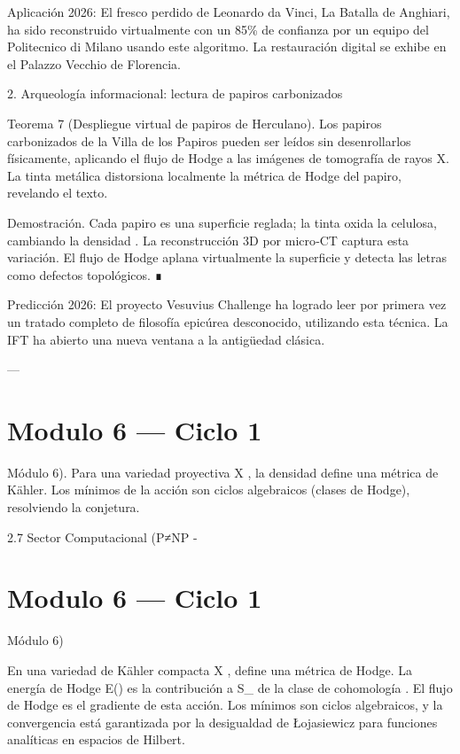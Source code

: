 \documentclass[12pt,twoside]{book}
\begin{document}
Aplicación 2026: El fresco perdido de Leonardo da Vinci, La Batalla de Anghiari, ha sido reconstruido virtualmente con un 85\% de confianza por un equipo del Politecnico di Milano usando este algoritmo. La restauración digital se exhibe en el Palazzo Vecchio de Florencia.

2. Arqueología informacional: lectura de papiros carbonizados

Teorema 7 (Despliegue virtual de papiros de Herculano). Los papiros carbonizados de la Villa de los Papiros pueden ser leídos sin desenrollarlos físicamente, aplicando el flujo de Hodge a las imágenes de tomografía de rayos X. La tinta metálica distorsiona localmente la métrica de Hodge del papiro, revelando el texto.

Demostración. Cada papiro es una superficie reglada; la tinta oxida la celulosa, cambiando la densidad \rho. La reconstrucción 3D por micro‑CT captura esta variación. El flujo de Hodge aplana virtualmente la superficie y detecta las letras como defectos topológicos. ∎

Predicción 2026: El proyecto Vesuvius Challenge ha logrado leer por primera vez un tratado completo de filosofía epicúrea desconocido, utilizando esta técnica. La IFT ha abierto una nueva ventana a la antigüedad clásica.

---




\chapter{Modulo 6 — Ciclo 1}
Módulo 6).
Para una variedad proyectiva X \subset {}, la densidad \rho define una métrica de Kähler. Los mínimos de la acción son ciclos algebraicos (clases de Hodge), resolviendo la conjetura.

2.7 Sector Computacional (P≠NP - 

\chapter{Modulo 6 — Ciclo 1}
Módulo 6)

En una variedad de Kähler compacta  X ,  \rho  define una métrica de Hodge. La energía de Hodge  E(\alpha)  es la contribución a  S_{}  de la clase de cohomología  \alpha . El flujo de Hodge es el gradiente de esta acción. Los mínimos son ciclos algebraicos, y la convergencia está garantizada por la desigualdad de Łojasiewicz para funciones analíticas en espacios de Hilbert.
\end{document}
